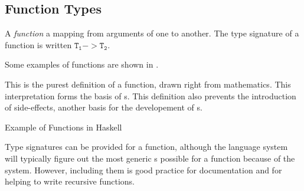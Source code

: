 \subsection{Function Types}\label{subsec:Function_Types}
\begin{definition}[Function]\label{def:Function}
  A \emph{function} a mapping from arguments of one  to another.
  The type signature of a function is written $\mathtt{T_{1}} -> \mathtt{T_{2}}$.

  Some examples of functions are shown in .

  \begin{remark}\label{rmk:Function_Definition_Pureness}
    This is the purest definition of a function, drawn right from mathematics.
    This interpretation forms the basis of s.
    This definition also prevents the introduction of side-effects, another basis for the developement of s.
  \end{remark}
\end{definition}

\begin{listing}[h!tbp]
\caption{Example of Functions in Haskell}
\label{lst:Function_Examples}
\end{listing}

Type signatures can be provided for a function, although the language system will typically figure out the most generic s possible for a function because of the  system.
However, including them is good practice for documentation and for helping to write recursive functions.

